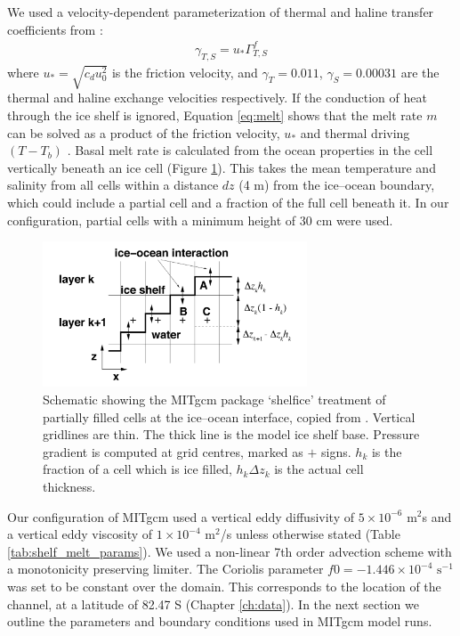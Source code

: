 We used a velocity-dependent parameterization of thermal and haline transfer coefficients from \cite{holland1999modeling}:
\begin{align}
    \gamma_{T,S} = u_* \Gamma^f_{T,S}
\end{align}
where $u_* = \sqrt{c_d u^2_0}$ is the friction velocity, and $\gamma_{T}=0.011$, $\gamma_{S}=0.00031$ are the thermal and haline exchange velocities respectively. 
If the conduction of heat through the ice shelf is ignored, Equation \ref{eq:melt} shows that the melt rate $m$ can be solved as a product of the friction velocity, $u_*$ and thermal driving $(T - T_b)$ \citep{holland2008response}. Basal melt rate is calculated from the ocean properties in the cell vertically beneath an ice cell (Figure \ref{fig:melt_cells}). This takes the mean temperature and salinity from all cells within a distance $dz$ (4 m) from the ice--ocean boundary, which could include a partial cell and a fraction of the full cell beneath it. In our configuration, partial cells with a minimum height of 30 cm were used.
\begin{figure}[!ht]
\centering
\includegraphics[width=0.7\textwidth]{chapters/4/melt_cells.png}
\caption[Melt schematic]{ Schematic showing the MITgcm package
`shelfice' treatment of partially filled cells at the ice--ocean interface, copied from \cite{losch2008modeling}. Vertical gridlines are thin. The thick line is the model ice shelf base.
Pressure gradient is computed at grid centres, marked as $+$ signs. $h_k$ is the fraction of a cell which is ice filled, $h_k \Delta z_k$ is the actual cell thickness.}
\label{fig:melt_cells}
\end{figure}

Our configuration of MITgcm used a vertical eddy diffusivity of  $5 \times 10^{-6}$ $\mathrm{m}^2$s and a vertical eddy viscosity of $1 \times 10^{-4}$ $\mathrm{m}^2$/s unless otherwise stated (Table \ref{tab:shelf_melt_params}). We used a non-linear 7th order advection scheme with a monotonicity preserving limiter.
The Coriolis parameter $f0 = -1.446 \times 10^{-4}$ $\mathrm{s}^{-1}$ was set to be constant over the domain. This corresponds to the location of the channel, at a latitude of 82.47 S (Chapter  \ref{ch:data}). 
In the next section we outline the parameters and boundary conditions used in MITgcm model runs.

